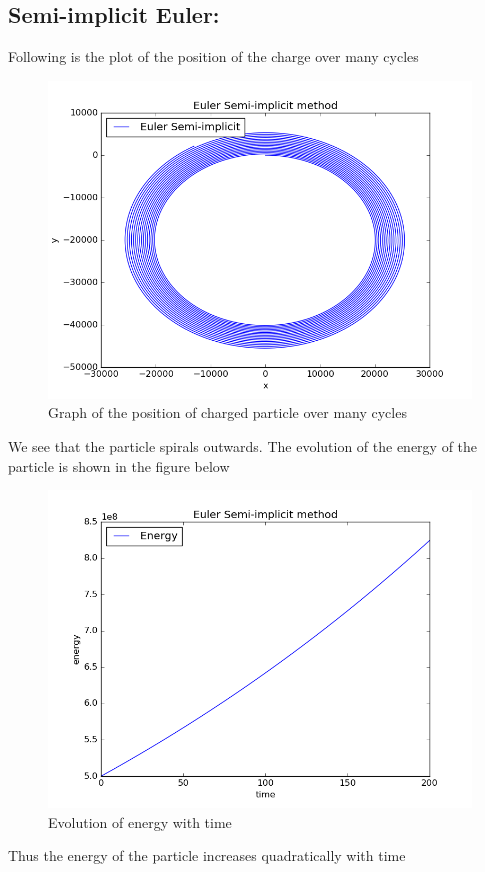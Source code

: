 \documentclass[11pt, a4paper]{article}
\begin{document}
\subsection{Semi-implicit Euler:}
Following is the plot of the position of the charge over many cycles
\begin{figure}[H]
 \centering
 \includegraphics[scale = 0.5]{Euler_sem_1.png}
 \caption{Graph of the position of charged particle over many cycles}
\end{figure}
We see that the particle spirals outwards.
\newpage
The evolution of the energy of the particle is shown in the figure below
\begin{figure}[H]
 \centering
 \includegraphics[scale = 0.5]{Euler_sem_en_1.png}
 \caption{Evolution of energy with time}
\end{figure}
Thus the energy of the particle increases quadratically with time
\end{document}
